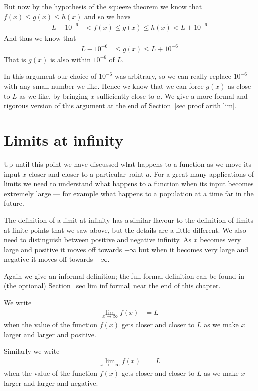 But now by the hypothesis of the squeeze theorem we know that $f(x) \leq g(x) \leq h(x)$ and so we have
\begin{align*}
L-10^{-6} &< f(x) \leq g(x) \leq h(x) < L+10^{-6}
\end{align*}
And thus we know that
\begin{align}
L-10^{-6} &\leq g(x) \leq L+10^{-6}
\end{align}
That is $g(x)$ is also within $10^{-6}$ of $L$.

In this argument our choice of $10^{-6}$ was arbitrary, so we can really replace $10^{-6}$ with any small number we like.
Hence we know that we can force $g(x)$ as close to $L$ as we like, by bringing $x$ sufficiently close to $a$. We give
a more formal and rigorous version of this argument at the end of Section~\ref{sec proof arith lim}.

\section{Limits at infinity}
Up until this point we have discussed what happens to a function as we move its input $x$
closer and closer to a particular point $a$. For a great many applications of
limits we need to understand what happens to a function when its input becomes
extremely large --- for example what happens to a population at a time far in
the future.

The definition of a limit at infinity has a similar flavour to the definition of limits at
finite points that we saw above, but the details are a little different. We also
need to distinguish between positive and negative infinity. As $x$ becomes
very large and positive it moves off towards $+\infty$ but when it becomes very
large and negative it moves off towards $-\infty$.


Again we give an informal definition; the full formal definition can be found
in (the optional) Section~\ref{sec lim inf formal} near the end of this chapter.
\begin{defn}
We write
\begin{align*}
\lim_{x \to \infty} f(x) &= L
\end{align*}
when the value of the function $f(x)$ gets closer and closer to $L$ as we make
$x$ larger and larger and positive.

Similarly we write
\begin{align*}
\lim_{x \to -\infty} f(x) &= L
\end{align*}
when the value of the function $f(x)$ gets closer and closer to $L$ as we make
$x$ larger and larger and negative.

\end{defn}

